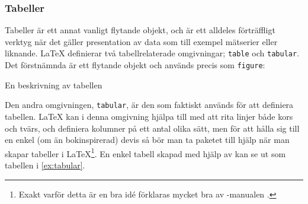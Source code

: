 \documentclass[10pt,../../a4.tex]{subfiles}
\begin{document}
\subsubsection{Tabeller}\label{pack:booktabs}
Tabeller är ett annat vanligt flytande objekt, och är ett alldeles
förträffligt verktyg när det gäller presentation av data som till exempel
mätserier eller liknande. \LaTeX{} definierar två tabellrelaterade
omgivningar; \texttt{table} och \texttt{tabular}. Det förstnämnda är ett
flytande objekt och används precis som \texttt{figure}:
\begin{latexcode}
\begin{table}[tpb]
\centering 
\caption{En beskrivning av tabellen}
\end{table}
\end{latexcode}

Den andra omgivningen, \texttt{tabular}, är den som faktiskt används för
att definiera tabellen. \LaTeX{} kan i denna omgivning hjälpa till med att
rita linjer både kors och tvärs, och definiera kolumner på ett antal olika
sätt, men för att hålla sig till en enkel (om än bokinspirerad) devis så
bör man ta paketet  till hjälp när man skapar tabeller i
\LaTeX\footnote{Exakt varför detta är en bra idé förklaras mycket bra av
-manualen \parencite{Fear05}.}.
En enkel tabell skapad med hjälp av  kan se ut som
tabellen i \cref{ex:tabular}.
\end{document}
